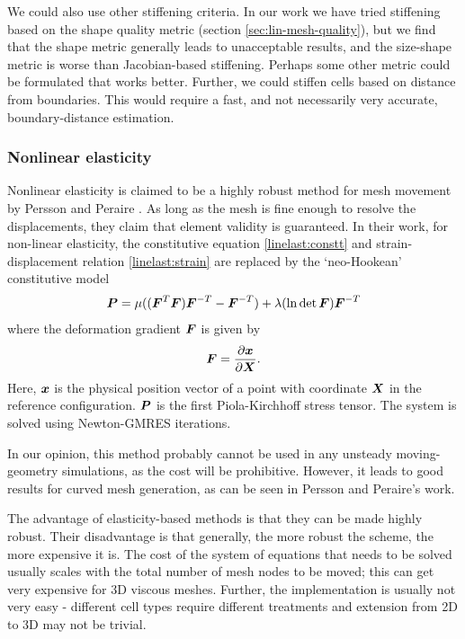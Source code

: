  We could also use other stiffening criteria. In our work we have tried stiffening based on the shape quality metric (section \ref{sec:lin-mesh-quality}), but we find that the shape metric generally leads to unacceptable results, and the size-shape metric is worse than Jacobian-based stiffening. Perhaps some other metric could be formulated that works better. Further, we could stiffen cells based on distance from boundaries. This would require a fast, and not necessarily very accurate, boundary-distance estimation.
 
 \subsubsection{Nonlinear elasticity}
 
 Nonlinear elasticity is claimed to be a highly robust method for mesh movement by Persson and Peraire \cite{curve:persson}. As long as the mesh is fine enough to resolve the displacements, they claim that element validity is guaranteed. In their work, for non-linear elasticity, the constitutive equation \eqref{linelast:constt} and strain-displacement relation \eqref{linelast:strain} are replaced by the `neo-Hookean' constitutive model
 \begin{equation}
 \boldsymbol{P} = \mu ((\boldsymbol{F}^T\boldsymbol{F})\boldsymbol{F}^{-T} - \boldsymbol{F}^{-T}) + \lambda(\ln \det\boldsymbol{F})\boldsymbol{F}^{-T}
 \end{equation}
 where the deformation gradient $\boldsymbol{F}$ is given by
 \[
 \boldsymbol{F} = \frac{\partial\boldsymbol{x}}{\partial\boldsymbol{X}}.
 \]
 Here, $\boldsymbol{x}$ is the physical position vector of a point with coordinate $\boldsymbol{X}$ in the reference configuration. $\boldsymbol{P}$ is the first Piola-Kirchhoff stress tensor. The system is solved using Newton-GMRES iterations.
 
 In our opinion, this method probably cannot be used in any unsteady moving-geometry simulations, as the cost will be prohibitive. However, it leads to good results for curved mesh generation, as can be seen in Persson and Peraire's work.
 
 The advantage of elasticity-based methods is that they can be made highly robust. Their disadvantage is that generally, the more robust the scheme, the more expensive it is. The cost of the system of equations that needs to be solved usually scales with the total number of mesh nodes to be moved; this can get very expensive for 3D viscous meshes. Further, the implementation is usually not very easy - different cell types require different treatments and extension from 2D to 3D may not be trivial.
 
